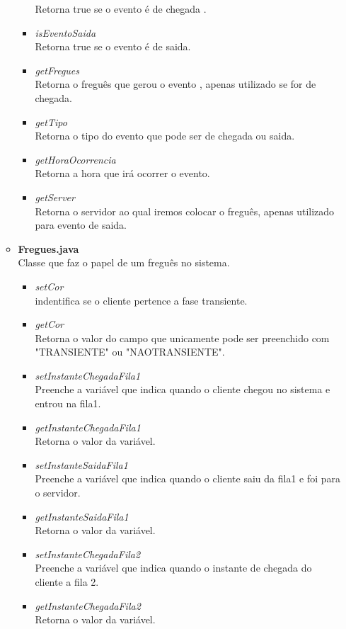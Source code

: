 \documentclass[a4paper,10pt]{article}
\begin{document}
\begin{itemize}
\begin{itemize}
\begin{itemize}
			  Retorna true se o evento é de chegada	.		  
			 \item  \textit{isEventoSaida\\}
 			  Retorna true se o evento é de saida.
			 \item  \textit{getFregues\\}
			  Retorna o freguês que gerou o evento , apenas utilizado se for de chegada.
			 \item  \textit{getTipo\\}
 			  Retorna o tipo do evento que pode ser de chegada ou saida.
			 \item  \textit{getHoraOcorrencia\\}
			  Retorna a hora que irá ocorrer o evento.
			 \item  \textit{getServer\\}
			  Retorna o servidor ao qual iremos colocar o freguês, apenas utilizado para evento de saida.			  
		    \end{itemize}
	      \item \textbf{Fregues.java\\}
		    Classe que faz o papel de um freguês no sistema.
		    \begin{itemize}
			 \item  \textit{setCor\\}indentifica se o cliente pertence a fase transiente.
			 \item  \textit{getCor\\}Retorna o valor do campo que unicamente pode ser preenchido com "TRANSIENTE" ou "NAOTRANSIENTE".
			 \item  \textit{setInstanteChegadaFila1\\}Preenche a variável que indica quando o cliente chegou no sistema e entrou na fila1.
			 \item  \textit{getInstanteChegadaFila1\\}Retorna o valor da variável.
			 \item  \textit{setInstanteSaidaFila1\\}Preenche a variável que indica quando o cliente saiu da fila1 e foi para o servidor.
			 \item  \textit{getInstanteSaidaFila1\\}Retorna o valor da variável.
			 \item  \textit{setInstanteChegadaFila2\\}Preenche a variável que indica quando o instante de chegada do cliente a fila 2.
			 \item  \textit{getInstanteChegadaFila2\\}Retorna o valor da variável.

\end{itemize}
\end{itemize}
\end{itemize}
\end{document}
